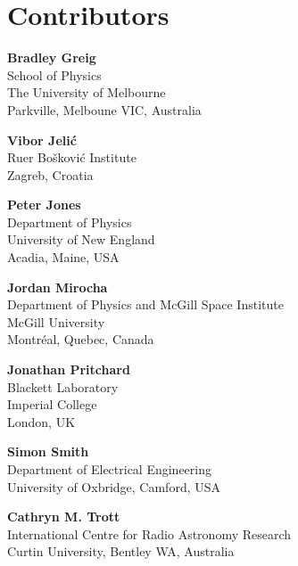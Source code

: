 \chapter*{Contributors}
 


{\parskip=12pt

\noindent\textbf{Bradley Greig}\\
School of Physics\\
The University of Melbourne\\
Parkville, Melboune VIC, Australia

\noindent\textbf{Vibor Jeli\'c}\\
Ru{\dj}er Bo\v{s}kovi\'{c} Institute\\ 
Zagreb, Croatia 

\noindent\textbf{Peter Jones}\\
Department of Physics\\
University of New England\\
Acadia, Maine, USA

\noindent\textbf{Jordan Mirocha}\\
Department of Physics and McGill Space Institute\\
McGill University \\
Montr\'eal, Quebec, Canada


\noindent\textbf{Jonathan Pritchard}\\
Blackett Laboratory\\
Imperial College\\
London, UK

\noindent\textbf{Simon Smith}\\
Department of Electrical Engineering\\
University of Oxbridge, 
Camford, USA

\noindent\textbf{Cathryn M. Trott}\\
International Centre for Radio Astronomy Research\\
Curtin University, Bentley WA, Australia

}
